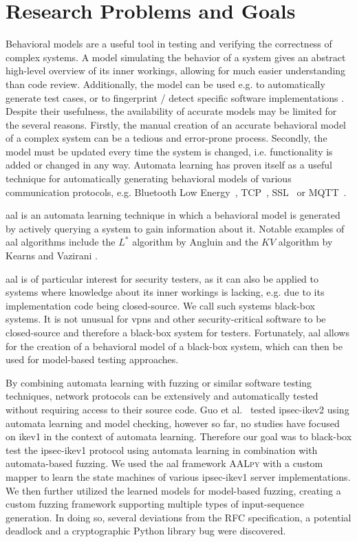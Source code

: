 \section{Research Problems and Goals}
Behavioral models are a useful tool in testing and verifying the correctness of complex systems. A model simulating the behavior of a system gives an abstract high-level overview of its inner workings, allowing for much easier understanding than code review. Additionally, the model can be used e.g. to automatically generate test cases, or to fingerprint / detect specific software implementations \cite{pferscher2021fingerprinting, pferscher2022fuzzing}. Despite their usefulness, the availability of accurate models may be limited for the several reasons. Firstly, the manual creation of an accurate behavioral model of a complex system can be a tedious and error-prone process. Secondly, the model must be updated every time the system is changed, i.e. functionality is added or changed in any way. Automata learning has proven itself as a useful technique for automatically generating behavioral models of various communication protocols, e.g. Bluetooth Low Energy~\cite{pferscher2021fingerprinting}, TCP~\cite{DBLP:conf/cav/Fiterau-Brostean16}, SSL~\cite{DBLP:conf/spin/Fiterau-Brostean17} or MQTT~\cite{DBLP:conf/icst/TapplerAB17}. 

\Ac{aal} is an automata learning technique in which a behavioral model is generated by actively querying a system to gain information about it. Notable examples of \ac{aal} algorithms include the $L^*$ algorithm by Angluin \cite{angluin1987learning} and the $KV$ algorithm by Kearns and Vazirani \cite{KV1994}.

\Ac{aal} is of particular interest for security testers, as it can also be applied to systems where knowledge about its inner workings is lacking, e.g. due to its implementation code being closed-source. We call such systems black-box systems. It is not unusual for \acp{vpn} and other security-critical software to be closed-source and therefore a black-box system for testers. Fortunately, \ac{aal} allows for the creation of a behavioral model of a black-box system, which can then be used for model-based testing approaches.

By combining automata learning with fuzzing or similar software testing techniques, network protocols can be extensively and automatically tested without requiring access to their source code. Guo et al.~\cite{guo2019model} tested \ac{ipsec}-\ac{ike}v2 using automata learning and model checking, however so far, no studies have focused on \ac{ike}v1 in the context of automata learning. Therefore our goal was to black-box test the \ac{ipsec}-\ac{ike}v1 protocol using automata learning in combination with automata-based fuzzing. We used the \ac{aal} framework \textsc{AALpy} \cite{muvskardin2022aalpy} with a custom mapper to learn the state machines of various \ac{ipsec}-\ac{ike}v1 server implementations. We then further utilized the learned models for model-based fuzzing, creating a custom fuzzing framework supporting multiple types of input-sequence generation. In doing so, several deviations from the RFC specification, a potential deadlock and a cryptographic Python library bug were discovered.

